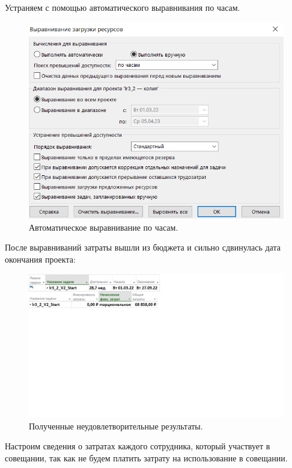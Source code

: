 \documentclass[a4paper,14pt]{extreport} %
\begin{document}
\begin{enumerate}
 Устраняем с помощью автоматического выравнивания по часам.

\begin{figure}[H]
  \centering
  \caption{Автоматическое выравнивание по часам. }
  \includegraphics[scale=0.8]{6}
\end{figure}

После выравниваний затраты вышли из бюджета и сильно сдвинулась дата окончания проекта:

\begin{figure}[H]
  \centering
  \caption{Полученные неудовлетворительные результаты. }
  \includegraphics[scale=0.9]{7}
\end{figure}

Настроим сведения о затратах каждого сотрудника, который участвует в совещании, так как не будем платить затрату на использование в совещании.


\end{enumerate}
\end{document}
